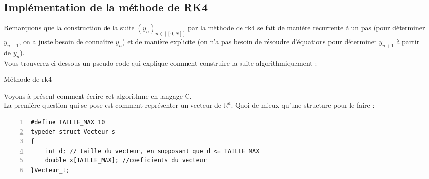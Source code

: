 \documentclass[9pt,a4paper]{article}
\begin{document}
\subsection{Implémentation de la méthode de RK4}
Remarquons que la construction de la suite $(y_n)_{n \in [\![0, N]\!]}$ par la méthode de \gls{rk4} se fait de manière récurrente à un pas (pour déterminer $y_{n + 1}$, on a juste besoin de connaître $y_n$) et de manière explicite (on n'a pas besoin de résoudre d'équations pour déterminer $y_{n + 1}$ à partir de $y_n$). \\
Vous trouverez ci-dessous un pseudo-code qui explique comment construire la suite algorithmiquement :
\begin{algorithm}[H]
    \caption{Méthode de \gls{rk4}}
    \SetAlgoLined
    \DontPrintSemicolon
\end{algorithm}
Voyons à présent comment écrire cet algorithme en langage C. \\
La première question qui se pose est comment représenter un vecteur de $\mathbb{R}^d$. Quoi de mieux qu'une structure pour le faire : \\
\begin{Verbatim}[numbers=left, frame=single]
#define TAILLE_MAX 10
typedef struct Vecteur_s
{
    int d; // taille du vecteur, en supposant que d <= TAILLE_MAX
    double x[TAILLE_MAX]; //coeficients du vecteur
}Vecteur_t;
\end{Verbatim}
\end{document}
